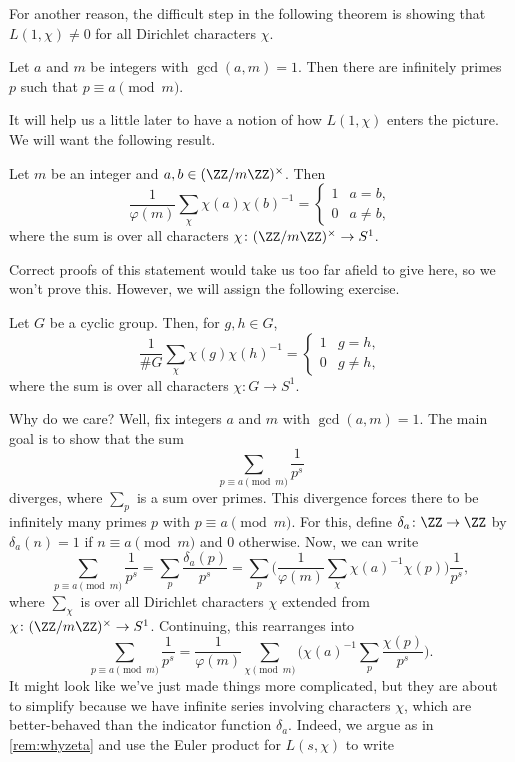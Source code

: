 \documentclass{article}
\begin{document}
For another reason, the difficult step in the following theorem is showing that $L(1,\chi)\ne0$ for all Dirichlet characters $\chi$.
\begin{theorem} \label{thm:dirichlet}
	Let $a$ and $m$ be integers with $\gcd(a,m)=1$. Then there are infinitely primes $p$ such that $p\equiv a\pmod m$.
\end{theorem}
It will help us a little later to have a notion of how $L(1,\chi)$ enters the picture. We will want the following result.
\begin{lemma}
	Let $m$ be an integer and $a,b\in(\ZZ/m\ZZ)^\times$. Then
	\[\frac1{\varphi(m)}\sum_\chi\chi(a)\chi(b)^{-1}=\begin{cases}
		1 & a=b, \\
		0 & a\ne b,
	\end{cases}\]
	where the sum is over all characters $\chi\colon(\ZZ/m\ZZ)^\times\to S^1$.
\end{lemma}
Correct proofs of this statement would take us too far afield to give here, so we won't prove this. However, we will assign the following exercise.
\begin{exe}
	Let $G$ be a cyclic group. Then, for $g,h\in G$,
	\[\frac1{\#G}\sum_\chi\chi(g)\chi(h)^{-1}=\begin{cases}
		1 & g=h, \\
		0 & g\ne h,
	\end{cases}\]
	where the sum is over all characters $\chi\colon G\to S^1$.
\end{exe}
Why do we care? Well, fix integers $a$ and $m$ with $\gcd(a,m)=1$. The main goal is to show that the sum
\[\sum_{p\equiv a\pmod m}\frac1{p^s}\]
diverges, where $\sum_p$ is a sum over primes. This divergence forces there to be infinitely many primes $p$ with $p\equiv a\pmod m$. For this, define $\delta_a\colon\ZZ\to\ZZ$ by $\delta_a(n)=1$ if $n\equiv a\pmod m$ and $0$ otherwise. Now, we can write
\[\sum_{p\equiv a\pmod m}\frac1{p^s}=\sum_p\frac{\delta_a(p)}{p^s}=\sum_p\Bigg(\frac1{\varphi(m)}\sum_\chi\chi(a)^{-1}\chi(p)\Bigg)\frac1{p^s},\]
where $\sum_\chi$ is over all Dirichlet characters $\chi$ extended from $\chi\colon(\ZZ/m\ZZ)^\times\to S^1$. Continuing, this rearranges into
\[\sum_{p\equiv a\pmod m}\frac1{p^s}=\frac1{\varphi(m)}\sum_{\chi\pmod m}\Bigg(\chi(a)^{-1}\sum_p\frac{\chi(p)}{p^s}\Bigg).\]
It might look like we've just made things more complicated, but they are about to simplify because we have infinite series involving characters $\chi$, which are better-behaved than the indicator function $\delta_a$. Indeed, we argue as in \autoref{rem:whyzeta} and use the Euler product for $L(s,\chi)$ to write
\end{document}
